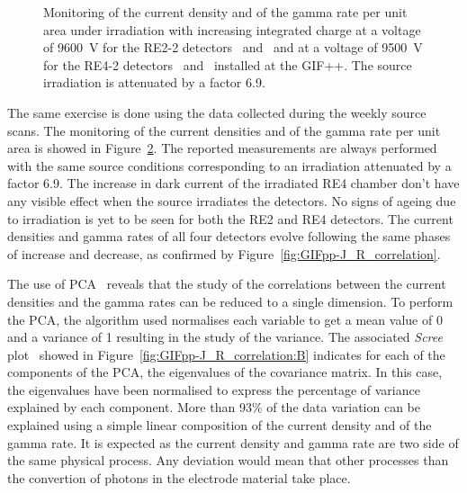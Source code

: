 \begin{figure}[H]
\begin{subfigure}{0.5\linewidth}
        	\caption{\label{fig:GIFpp-Source-mon:D}}
    	\end{subfigure}
		\caption{\label{fig:GIFpp-Source-mon} Monitoring of the current density and of the gamma rate per unit area under irradiation with increasing integrated charge at a voltage of \SI{9600}{V} for the RE2-2 detectors~ and~ and at a voltage of \SI{9500}{V} for the RE4-2 detectors~ and~ installed at the GIF++. The source irradiation is attenuated by a factor 6.9.}
	\end{figure}
	
	The same exercise is done using the data collected during the weekly source scans. The monitoring of the current densities and of the gamma rate per unit area is showed in Figure~\ref{fig:GIFpp-Source-mon}. The reported measurements are always performed with the same source conditions corresponding to an irradiation attenuated by a factor 6.9. The increase in dark current of the irradiated RE4 chamber don't have any visible effect when the source irradiates the detectors. No signs of ageing due to irradiation is yet to be seen for both the RE2 and RE4 detectors. The current densities and gamma rates of all four detectors evolve following the same phases of increase and decrease, as confirmed by Figure~\ref{fig:GIFpp-J_R_correlation}.
	
	The use of \acf{PCA}~\cite{PCA} reveals that the study of the correlations between the current densities and the gamma rates can be reduced to a single dimension. To perform the PCA, the algorithm used normalises each variable to get a mean value of 0 and a variance of 1 resulting in the study of the variance. The associated \textit{Scree} plot~\cite{SCREE} showed in Figure~\ref{fig:GIFpp-J_R_correlation:B} indicates for each of the components of the PCA, the eigenvalues of the covariance matrix. In this case, the eigenvalues have been normalised to express the percentage of variance explained by each component. More than 93\% of the data variation can be explained using a simple linear composition of the current density and of the gamma rate. It is expected as the current density and gamma rate are two side of the same physical process. Any deviation would mean that other processes than the convertion of photons in the electrode material take place.

